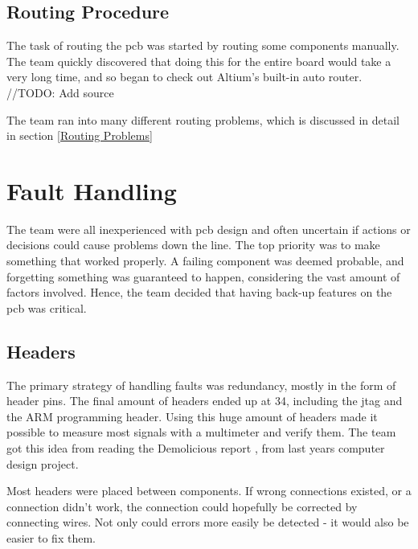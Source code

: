 \subsection{Routing Procedure}
The task of routing the \gls{pcb} was started by routing some components manually.
The team quickly discovered that doing this for the entire board would take a very long time, and so began to check out Altium's built-in auto router.
//TODO: Add source

The team ran into many different routing problems, which is discussed in detail in section \ref{Routing Problems}

\section{Fault Handling}
The team were all inexperienced with \gls{pcb} design and often uncertain if actions or decisions could cause problems down the line.
The top priority was to make something that worked properly.
A failing component was deemed probable, and forgetting something was guaranteed to happen, considering the vast amount of factors involved.
Hence, the team decided that having back-up features on the \gls{pcb} was critical.

\subsection{Headers}
The primary strategy of handling faults was redundancy, mostly in the form of header pins.
The final amount of headers ended up at 34, including the \gls{jtag} and the ARM programming header.
Using this huge amount of headers made it possible to measure most signals with a multimeter and verify them.
The team got this idea from reading the Demolicious report \cite{demolicious-report}, from last years computer design project.

Most headers were placed between components.
If wrong connections existed, or a connection didn't work, the connection could hopefully be corrected by connecting wires.
Not only could errors more easily be detected - it would also be easier to fix them.

